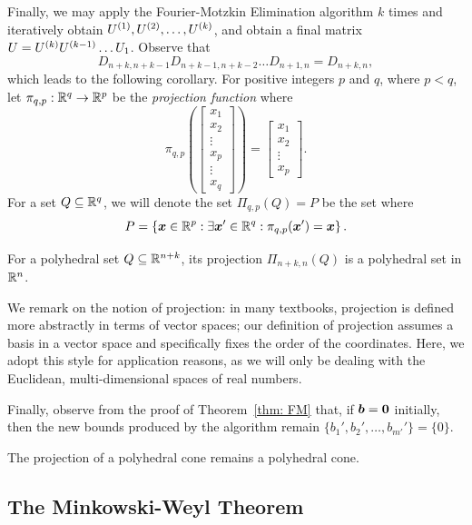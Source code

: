 Finally, we may apply the Fourier-Motzkin Elimination algorithm $k$ times and iteratively obtain $U^{(1)}, U^{(2)}, \dots, U^{(k)}$, and obtain a final matrix $U = U^{(k)} U^{(k-1)}\dots U_1$. Observe that \[D_{n+k, n+k-1}D_{n+k-1, n+k-2} \dots D_{n+1, n} = D_{n+k, n}, \] which leads to the following corollary. For positive integers $p$ and $q$, where $p<q$, let $\pi_{q, p}: \mathbb R^{q} \to \mathbb R^p$ be the {\em projection function} where 
\[ \pi_{q, p}\left(\begin{bmatrix} x_1 \\ x_2 \\ \vdots \\ x_p \\ \vdots \\ x_q \end{bmatrix}\right) = \begin{bmatrix} x_1 \\ x_2 \\ \vdots \\ x_p  \end{bmatrix}. \] For a set $Q\subseteq \mathbb R^{q}$, we will denote the set $\Pi_{q, p}(Q) = P$ be the set where 
\[ P = \left\{ {\boldsymbol x}\in\mathbb R^p: \exists {\boldsymbol x}'\in\mathbb R^{q}: \pi_{q, p}({\boldsymbol x}') = {\boldsymbol x}  \right\}. \]

\begin{corollary}\label{cor: FM projection}
For a polyhedral set $Q\subseteq \mathbb R^{n+k}$, its projection $\Pi_{n+k, n}(Q)$ is a polyhedral set in $\mathbb R^n$. 
\end{corollary}
We remark on the notion of projection: in many textbooks, projection is defined more abstractly in terms of vector spaces; our definition of projection assumes a basis in a vector space and specifically fixes the order of the coordinates. Here, we adopt this style for application reasons, as we will only be dealing with the Euclidean, multi-dimensional spaces of real numbers. 

Finally, observe from the proof of Theorem~\ref{thm: FM} that, if ${\boldsymbol b} = \boldsymbol0$ initially, then the new bounds produced by the algorithm remain $\{b_1', b_2', \dots, b_{m'}'\} = \{0\}$. 

\begin{corollary}\label{cor: FM cone remains cone}
The projection of a polyhedral cone remains a polyhedral cone. 
\end{corollary}

\subsection{The Minkowski-Weyl Theorem}

